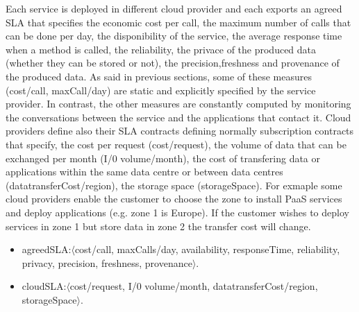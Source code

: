 Each service is deployed in different cloud provider and each exports an agreed SLA that specifies the economic cost per call, the maximum number of calls that can be done per day, the disponibility of the service, the average response time when a method is called, the reliability, the privace of the produced data (whether they can be stored or not), the precision,freshness and provenance of the produced data. As said in previous sections, some of these measures ({\sf cost/call, maxCall/day}) are static and explicitly specified by the service provider. In contrast, the other measures are constantly computed by monitoring the conversations between the service and the applications that contact it.  Cloud providers define also their SLA contracts defining normally subscription contracts that specify, the cost per request ({\sf cost/request}), the volume of data that can be exchanged per month ({\sf I/0 volume/month}), the cost of transfering data or applications within the same data centre or between data centres ({\sf datatransferCost/region}), the storage space ({\sf storageSpace}). For exmaple some cloud providers enable the customer to choose the zone to install PaaS services and deploy applications (e.g. zone 1 is Europe). If the customer wishes to deploy services in zone 1 but store data in zone 2 the transfer cost will change.

\begin{itemize}
\sf\footnotesize
 \item {\sf agreedSLA:$\langle$cost/call, maxCalls/day, availability, responseTime, reliability, privacy, precision, freshness, provenance$\rangle$}. 
 
 \item  {\sf cloudSLA:$\langle$cost/request, I/0 volume/month, datatransferCost/region, storageSpace$\rangle$}. 
 \end{itemize}
 

